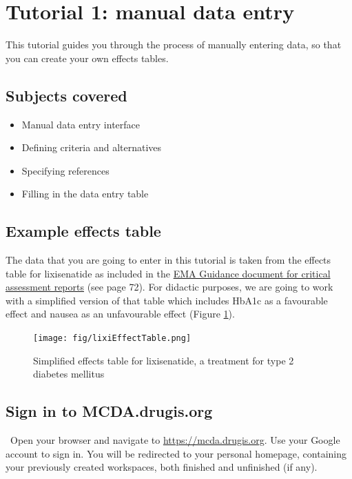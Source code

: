 \documentclass[00_mcda_tutorial.tex]{subfiles}
\begin{document}
\section*{Tutorial 1: manual data entry}
\addtocounter{section}{1}

This tutorial guides you through the process of manually entering data, so that you can create your own effects tables.

\subsection*{Subjects covered}
\begin{itemize}
    \item Manual data entry interface
    \item Defining criteria and alternatives
    \item Specifying references
    \item Filling in the data entry table
\end{itemize}

\subsection*{Example effects table}
The data that you are going to enter in this tutorial is taken from the effects table for lixisenatide as included in the \href{https://www.ema.europa.eu/documents/template-form/day-80-assessment-report-overview-d120-loq-template-guidance-rev-1019_en.docx}{EMA Guidance document for critical assessment reports} (see page 72).  For didactic purposes, we are going to work with a simplified version of that table which includes HbA1c as a favourable effect and nausea as an unfavourable effect (Figure \ref{fig:lixisenatide_effect_table}).

\begin{figure}[!h]
    \centering
    \texttt{[image: fig/lixiEffectTable.png]}
    \caption{Simplified effects table for lixisenatide, a treatment for type 2 diabetes mellitus}
    \label{fig:lixisenatide_effect_table}
\end{figure}

\subsection*{Sign in to MCDA.drugis.org}
\leftpointright \, Open your browser and navigate to \href{https://mcda.drugis.org}{https://mcda.drugis.org}. Use your Google account to sign in. You will be redirected to your personal homepage, containing your previously created workspaces, both finished and unfinished (if any).
\end{document}
